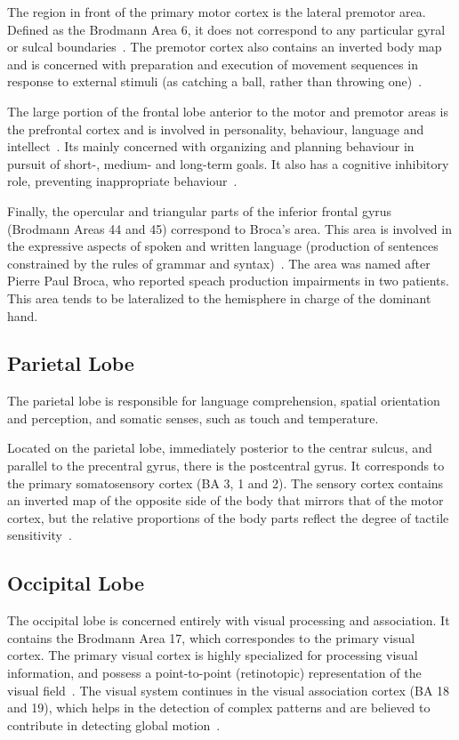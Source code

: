 The region in front of the primary motor cortex is the lateral premotor area.
Defined as the Brodmann Area 6, it does not correspond to any particular gyral
or sulcal boundaries~\cite{Johns, Purves2004}. The premotor cortex also contains
an inverted body map and is concerned with preparation and execution of movement
sequences in response to external stimuli (as catching a ball, rather than throwing one)~\cite{Johns}.

The large portion of the frontal lobe anterior to the motor
and premotor areas is the prefrontal cortex and is involved in personality, 
behaviour, language and intellect~\cite{Johns}. Its mainly concerned with
organizing and planning behaviour in pursuit of short-, medium- and long-term goals.
It also has a cognitive inhibitory role, preventing inappropriate behaviour~\cite{Sigman2017}.

Finally, the opercular and triangular parts of the inferior frontal gyrus
(Brodmann Areas 44 and 45) correspond to Broca’s area. This area is involved in
the expressive aspects of spoken and written language (production of sentences
constrained by the rules of grammar and syntax)~\cite{Johns}. The area was named
after Pierre Paul Broca, who reported speach production impairments in two patients.
This area tends to be lateralized to the hemisphere in charge of the dominant
hand. 

\subsection{Parietal Lobe}
The parietal lobe is responsible for language comprehension, spatial orientation
and perception, and somatic senses, such as touch and temperature.

Located on the parietal lobe, immediately posterior to the centrar sulcus, and
parallel to the precentral gyrus, there is the postcentral gyrus. It corresponds 
to the primary somatosensory cortex (BA 3, 1 and 2). The sensory cortex contains
an inverted map of the opposite side of the body that mirrors that of the motor
cortex, but the relative proportions of the body parts reflect the degree of 
tactile sensitivity~\cite{Johns}.

\subsection{Occipital Lobe}
The occipital lobe is concerned entirely with visual processing and association.
It contains the Brodmann Area 17, which correspondes to the primary visual cortex.
The primary visual cortex is highly specialized for processing visual information, and
possess a point-to-point (retinotopic) representation of the visual field~\cite{Johns}.
The visual system continues in the visual association cortex (BA 18 and 19),
which helps in the detection of complex patterns and are believed to contribute
in detecting global motion~\cite{Johns, Purves2004}.

